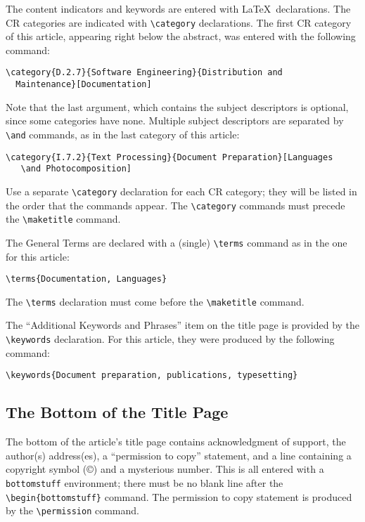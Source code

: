 The content indicators and keywords are entered with \LaTeX\ 
declarations.  The CR categories are indicated with \verb|\category|
declarations.  The first CR category of this article, appearing
right below the abstract, was entered with the following command:
\begin{verbatim}
\category{D.2.7}{Software Engineering}{Distribution and 
  Maintenance}[Documentation]
\end{verbatim}
Note that the last argument, which contains the subject descriptors
is optional, since some categories have none.  Multiple subject descriptors
are separated by \verb|\and| commands, as in the last category of
this article:
\begin{verbatim}
\category{I.7.2}{Text Processing}{Document Preparation}[Languages 
   \and Photocomposition]
\end{verbatim}
Use a separate \verb|\category| declaration for each CR category;
they will be listed in the order that the commands appear.  The
\verb|\category| commands must precede the \verb|\maketitle|
command.

The General Terms are declared with a (single) \verb|\terms|
command as in the one for this article:
\begin{verbatim}
\terms{Documentation, Languages}
\end{verbatim}
The \verb|\terms| declaration must come before the \verb|\maketitle|
command.

The ``Additional Keywords and Phrases'' item on the title page
is provided by the \verb|\keywords| declaration.  For this article,
they were produced by the following command:
\begin{verbatim}
\keywords{Document preparation, publications, typesetting}
\end{verbatim}

\subsection{The Bottom of the Title Page}

The bottom of the article's title page contains acknowledgment of
support, the author(s) address(es), a ``permission to copy'' statement,
and a line containing a copyright symbol (\copyright) and a mysterious
number.  This is all entered with a {\tt bottomstuff} environment;
there must be no blank line after the \verb|\begin{bottomstuff}|
command.  The permission to copy statement is produced by the
\verb|\permission| command.

